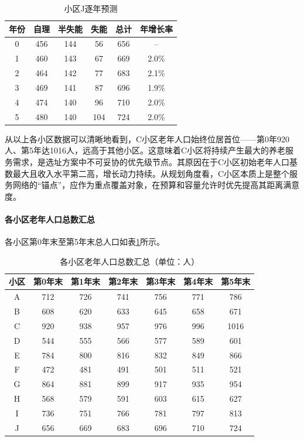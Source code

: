 \documentclass[UTF8]{ctexart}
\begin{document}
\begin{table}[H]
\centering
\caption{小区J逐年预测}
\renewcommand{\arraystretch}{1.3}
\begin{tabular}{|c|c|c|c|c|c|}
\hline
\textbf{年份} & \textbf{自理} & \textbf{半失能} & \textbf{失能} & \textbf{总计} & \textbf{年增长率} \\
\hline
0 & 456 & 144 & 56 & 656 & -- \\
\hline
1 & 460 & 143 & 67 & 669 & 2.0\% \\
\hline
2 & 464 & 142 & 77 & 683 & 2.1\% \\
\hline
3 & 469 & 141 & 87 & 696 & 1.9\% \\
\hline
4 & 474 & 140 & 96 & 710 & 2.0\% \\
\hline
5 & 480 & 140 & 104 & 724 & 2.0\% \\
\hline
\end{tabular}
\end{table}

从以上各小区数据可以清晰地看到，C小区老年人口始终位居首位——第0年920人、第5年达1016人，远高于其他小区。这意味着C小区将持续产生最大的养老服务需求，是选址方案中不可妥协的优先级节点。其原因在于C小区初始老年人口基数最大且收入水平第二高，增长动力持续。从规划角度看，C小区本质上是整个服务网络的“锚点”，应作为重点覆盖对象，在预算和容量允许时优先提高其距离满意度。

\paragraph{各小区老年人口总数汇总}
各小区第0年末至第5年末总人口如表\ref{tab:total_pop}所示。

\begin{table}[H]
\centering
\caption{各小区老年人口总数汇总（单位：人）}
\label{tab:total_pop}
\renewcommand{\arraystretch}{1.3}
\begin{tabular}{|c|c|c|c|c|c|c|}
\hline
\textbf{小区} & \textbf{第0年末} & \textbf{第1年末} & \textbf{第2年末} & \textbf{第3年末} & \textbf{第4年末} & \textbf{第5年末} \\
\hline
A & 712 & 726 & 741 & 756 & 771 & 786 \\
\hline
B & 608 & 620 & 633 & 645 & 658 & 671 \\
\hline
C & 920 & 938 & 957 & 976 & 996 & 1016 \\
\hline
D & 544 & 555 & 566 & 577 & 589 & 601 \\
\hline
E & 784 & 800 & 816 & 832 & 849 & 866 \\
\hline
F & 472 & 481 & 491 & 501 & 511 & 521 \\
\hline
G & 864 & 881 & 899 & 917 & 935 & 954 \\
\hline
H & 568 & 579 & 591 & 603 & 615 & 627 \\
\hline
I & 736 & 751 & 766 & 781 & 797 & 813 \\
\hline
J & 656 & 669 & 683 & 696 & 710 & 724 \\
\hline
\end{tabular}
\end{table}
\end{document}
